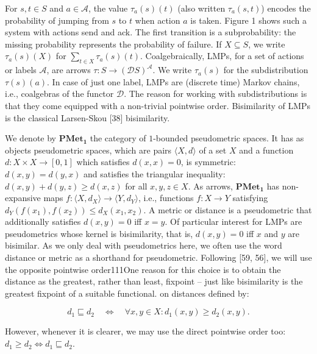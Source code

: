\documentclass[10pt,a4paper]{article}
\begin{document}
For $s,t\in S$ and $a\in\mathcal{A}$, the value $\tau_{a}(s)(t)$ (also written $\tau_{a}(s,t)$) encodes the probability of jumping from $s$ to $t$ when action $a$ is taken. Figure 1 shows such a system with actions send and ack. The first transition is a subprobability: the missing probability represents the probability of failure. If $X\subseteq S$, we write $\tau_{a}(s)(X)$ for $\sum_{t\in X}\tau_{a}(s)(t)$. Coalgebraically, LMPs, for a set of actions or labels $\mathcal{A}$, are arrows $\tau\colon S\to(\mathcal{D}S)^{\mathcal{A}}$. We write $\tau_{a}(s)$ for the subdistribution $\tau(s)(a)$. In case of just one label, LMPs are (discrete time) Markov chains, i.e., coalgebras of the functor $\mathcal{D}$. The reason for working with subdistributions is that they come equipped with a non-trivial pointwise order. Bisimilarity of LMPs is the classical Larsen-Skou [38] bisimilarity.\par
 
 
 
We denote by $\mathbf{PMet_{1}}$ the category of $1$-bounded pseudometric spaces. It has as objects pseudometric spaces, which are pairs $\langle X,d\rangle$ of a set $X$ and a function $d\colon X\times X\to[0,1]$ which satisfies $d(x,x)=0$, is symmetric: $d(x,y)=d(y,x)$ and satisfies the triangular inequality: $d(x,y)+d(y,z)\geq d(x,z)$ for all $x,y,z\in X$. As arrows, $\mathbf{PMet_{1}}$ has non-expansive maps $f\colon\langle X,d_{X}\rangle\to\langle Y,d_{Y}\rangle$, i.e., functions $f\colon X\to Y$ satisfying $d_{Y}(f(x_{1}),f(x_{2}))\leq d_{X}(x_{1},x_{2})$. A metric or distance is a pseudometric that additionally satisfies $d(x,y)=0$ iff $x=y$. Of particular interest for LMPs are pseudometrics whose kernel is bisimilarity, that is, $d(x,y)=0$ iff $x$ and $y$ are bisimilar. As we only deal with pseudometrics here, we often use the word distance or metric as a shorthand for pseudometric. Following [59, 56], we will use the opposite pointwise order111One reason for this choice is to obtain the distance as the greatest, rather than least, fixpoint – just like bisimilarity is the greatest fixpoint of a suitable functional. on distances defined by:\par
  
\par  \quad  \[d_{1}\sqsubseteq d_{2}\quad\Longleftrightarrow\quad\forall x,y\in X:d_{1}(x,y)\geq d_{2}(x,y).\]\quad  \quad  
  
However, whenever it is clearer, we may use the direct pointwise order too: $d_{1}\geq d_{2}\Leftrightarrow d_{1}\sqsubseteq d_{2}$.\par
 
\end{document}
